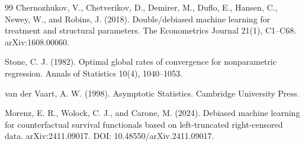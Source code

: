 \documentclass{article}
\begin{document}
\begin{thebibliography}{99}
   Chernozhukov, V., Chetverikov, D., Demirer, M., Duflo, E., Hansen, C., Newey, W., and Robins, J. (2018). Double/debiased machine learning for treatment and structural parameters. The Econometrics Journal 21(1), C1--C68. arXiv:1608.00060.

   Stone, C. J. (1982). Optimal global rates of convergence for nonparametric regression. Annals of Statistics 10(4), 1040--1053.

   van der Vaart, A. W. (1998). Asymptotic Statistics. Cambridge University Press.

   Morenz, E. R., Wolock, C. J., and Carone, M. (2024). Debiased machine learning for counterfactual survival functionals based on left-truncated right-censored data. arXiv:2411.09017. DOI: 10.48550/arXiv.2411.09017.

\end{thebibliography}
\end{document}
